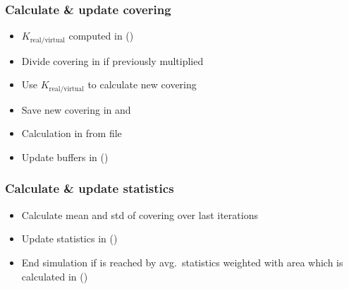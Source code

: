 \subsubsection{Calculate \& update covering}
\begin{itemize}[noitemsep,topsep=0pt, partopsep=0pt]
\item $K_{\text{real}/\text{virtual}}$ computed in  ()
\item Divide covering in   if previously multiplied
\item Use $K_{\text{real}/\text{virtual}}$ to calculate new covering
\item Save new covering in  and 
\item Calculation in  from  file
\item Update buffers in  ()
\end{itemize}

\subsubsection{Calculate \& update statistics}
\begin{itemize}[noitemsep,topsep=0pt, partopsep=0pt]
\item Calculate mean and std of covering over last  iterations
\item Update statistics in  ()
\item End simulation if  is reached by avg.\ statistics weighted with area which is calculated in  ()
\end{itemize}

